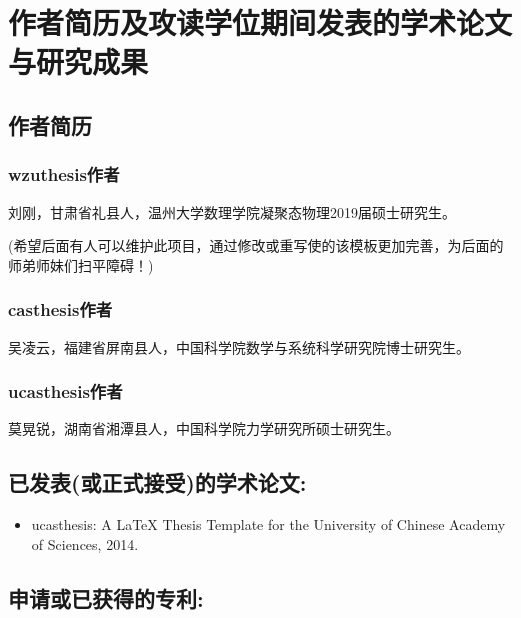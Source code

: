 \chapter{作者简历及攻读学位期间发表的学术论文与研究成果}


\section*{作者简历}

\subsection*{wzuthesis作者}

刘刚，甘肃省礼县人，温州大学数理学院凝聚态物理2019届硕士研究生。

(希望后面有人可以维护此项目，通过修改或重写使的该模板更加完善，为后面的师弟师妹们扫平障碍！)
\subsection*{casthesis作者}
%
吴凌云，福建省屏南县人，中国科学院数学与系统科学研究院博士研究生。

\subsection*{ucasthesis作者}

莫晃锐，湖南省湘潭县人，中国科学院力学研究所硕士研究生。

\section*{已发表(或正式接受)的学术论文:}

{
\begin{itemize}[nosep]
    \item ucasthesis: A LaTeX Thesis Template for the University of Chinese Academy of Sciences, 2014.
\end{itemize}
}

\section*{申请或已获得的专利:}

